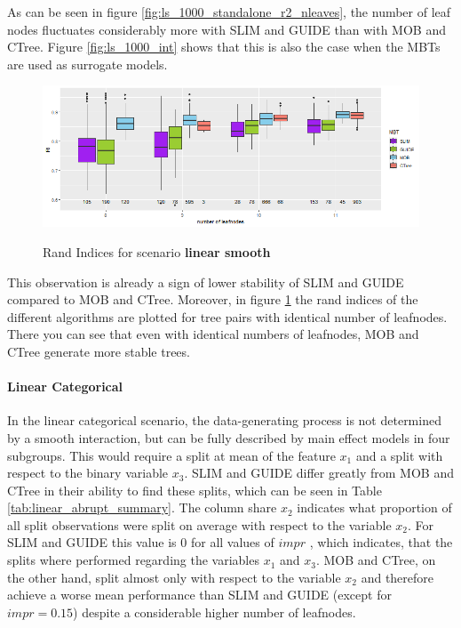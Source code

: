 As can be seen in figure \ref{fig:ls_1000_standalone_r2_nleaves}, the number of leaf nodes fluctuates considerably more with SLIM and GUIDE than with MOB and CTree. 
Figure \ref{fig:ls_1000_int} shows that this is also the case when the MBTs are used as surrogate models. 


\begin{figure}[!htb]
\caption{Rand Indices for scenario \textbf{linear smooth}}
    \centering
    \includegraphics[width=16cm]{Figures/simulations/batchtools/basic_scenarios/linear_smooth/ls_1000_standalone_sta.png}
    \label{fig:ls_1000_standalone_sta}
\end{figure}

This observation is already a sign of lower stability of SLIM and GUIDE compared to MOB and CTree. Moreover, in figure \ref{fig:ls_1000_standalone_sta} the rand indices of the different algorithms are plotted for tree pairs with identical number of leafnodes. There you can see that even with identical numbers of leafnodes, MOB and CTree generate more stable trees.







\paragraph{Linear Categorical} 
In the linear categorical scenario, the data-generating process is not determined by a smooth interaction, but can be fully described by main effect models in four subgroups.
This would require a split at mean of the feature $x_1$ and a split with respect to the binary variable $x_3$. 
SLIM and GUIDE differ greatly from MOB and CTree in their ability to find these splits, which can be seen in Table \ref{tab:linear_abrupt_summary}. 
The column share $x_2$ indicates what proportion of all split observations were split on average with respect to the variable $x_2$.
For SLIM and GUIDE this value is $0$ for all values of $impr$ , which indicates, that the splits where performed regarding the variables $x_1$ and $x_3$.
MOB and CTree, on the other hand, split almost only with respect to the variable $x_2$ and therefore achieve a worse mean performance than SLIM and GUIDE (except for $impr = 0.15$) despite a considerable higher number of leafnodes.

